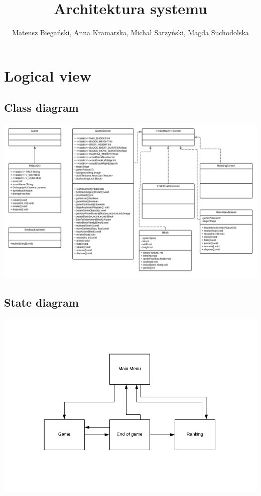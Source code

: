 \documentclass{article}
\begin{document}
\title{Architektura systemu}

\author{Mateusz Biegański, Anna Kramarska, Michał Sarzyński, Magda Suchodolska}
\maketitle

\section{Logical view}
\subsection{Class diagram}
\begin{center}
    \includegraphics[scale=0.1]{logicalview1.png}
\end{center}

\subsection{State diagram}
\begin{center}
    \includegraphics[scale=0.3]{logicalview2.png}
\end{center}
\end{document}
